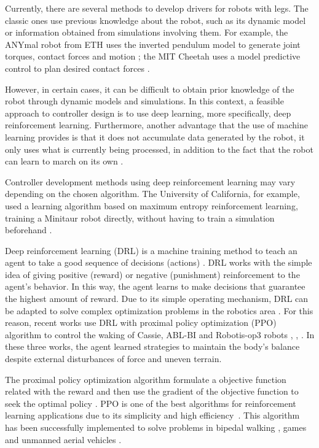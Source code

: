 Currently, there are several methods to develop drivers for robots with legs. The classic ones use previous knowledge about the robot, such as its dynamic model or information obtained from simulations involving them. For example, the ANYmal robot from ETH uses the inverted pendulum model to generate joint torques, contact forces and motion \cite{anymal}; the MIT Cheetah uses a model predictive control to plan desired contact forces \cite{cheetah}.

However, in certain cases, it can be difficult to obtain prior knowledge of the robot through dynamic models and simulations. In this context, a feasible approach to controller design is to use deep learning, more specifically, deep reinforcement learning. Furthermore, another advantage that the use of machine learning provides is that it does not accumulate data generated by the robot, it only uses what is currently being processed, in addition to the fact that the robot can learn to march on its own \cite{haarnoja2018learning}.

Controller development methods using deep reinforcement learning may vary depending on the chosen algorithm. The University of California, for example, used a learning algorithm based on maximum entropy reinforcement learning, training a Minitaur robot directly, without having to train a simulation beforehand \cite{haarnoja2018learning}.

Deep reinforcement learning (DRL) is a machine training method to teach an agent to take a good sequence of decisions (actions) \cite{sutton2018reinforcement}. DRL works with the simple idea of giving positive (reward) or negative (punishment) reinforcement to the agent's behavior. In this way, the agent learns to make decisions that guarantee the highest amount of reward. Due to its simple operating mechanism, DRL can be adapted to solve complex optimization problems in the robotics area \cite{kober2013reinforcement}. For this reason, recent works use DRL with proximal policy optimization (PPO) algorithm to control the waking of Cassie, ABL-BI and Robotis-op3 robots \cite{xie2018feedback}, \cite{beranek2021behavior}, \cite{jiang2020motion}. In these three works, the agent learned strategies to maintain the body's balance despite external disturbances of force and uneven terrain. 


The proximal policy optimization algorithm formulate a objective function related with the reward and then use the gradient of the objective function to seek the optimal policy \cite{schulman2017proximal}. PPO is one of the best algorithms for reinforcement learning applications due to its simplicity and high efficiency~\cite{schulman2017proximal}. This algorithm has been successfully implemented to solve problems in bipedal walking \cite{melo2019learning}, games \cite{kristensen2020strategies} and unmanned aerial vehicles \cite{bohn2019deep}.



